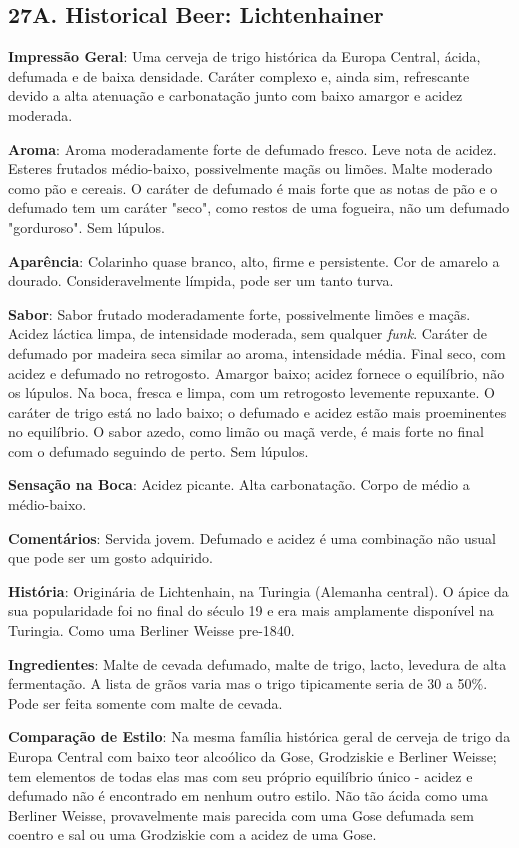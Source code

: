 \subsection*{27A. Historical Beer: Lichtenhainer}
\textbf{Impressão Geral}: Uma cerveja de trigo histórica da Europa Central, ácida, defumada e de baixa densidade. Caráter complexo e, ainda sim, refrescante devido a alta atenuação e carbonatação junto com baixo amargor e acidez moderada.

\textbf{Aroma}: Aroma moderadamente forte de defumado fresco. Leve nota de acidez. Esteres frutados médio-baixo, possivelmente maçãs ou limões. Malte moderado como pão e cereais. O caráter de defumado é mais forte que as notas de pão e o defumado tem um caráter "seco", como restos de uma fogueira, não um defumado "gorduroso". Sem lúpulos.

\textbf{Aparência}: Colarinho quase branco, alto, firme e persistente. Cor de amarelo a dourado. Consideravelmente límpida, pode ser um tanto turva.

\textbf{Sabor}: Sabor frutado moderadamente forte, possivelmente limões e maçãs. Acidez láctica limpa, de intensidade moderada, sem qualquer \textit{funk}. Caráter de defumado por madeira seca similar ao aroma, intensidade média. Final seco, com acidez e defumado no retrogosto. Amargor baixo; acidez fornece o equilíbrio, não os lúpulos. Na boca, fresca e limpa, com um retrogosto levemente repuxante. O caráter de trigo está no lado baixo; o defumado e acidez estão mais proeminentes no equilíbrio. O sabor azedo, como limão ou maçã verde, é mais forte no final com o defumado seguindo de perto. Sem lúpulos.

\textbf{Sensação na Boca}: Acidez picante. Alta carbonatação. Corpo de médio a médio-baixo.

\textbf{Comentários}: Servida jovem. Defumado e acidez é uma combinação não usual que pode ser um gosto adquirido.

\textbf{História}: Originária de Lichtenhain, na Turingia (Alemanha central). O ápice da sua popularidade foi no final do século 19 e era mais amplamente disponível na Turingia. Como uma Berliner Weisse pre-1840.

\textbf{Ingredientes}: Malte de cevada defumado, malte de trigo, lacto, levedura de alta fermentação. A lista de grãos varia mas o trigo tipicamente seria de 30 a 50\%. Pode ser feita somente com malte de cevada.

\textbf{Comparação de Estilo}: Na mesma família histórica geral de cerveja de trigo da Europa Central com baixo teor alcoólico da Gose, Grodziskie e Berliner Weisse; tem elementos de todas elas mas com seu próprio equilíbrio único - acidez e defumado não é encontrado em nenhum outro estilo. Não tão ácida como uma Berliner Weisse, provavelmente mais parecida com uma Gose defumada sem coentro e sal ou uma Grodziskie com a acidez de uma Gose.

